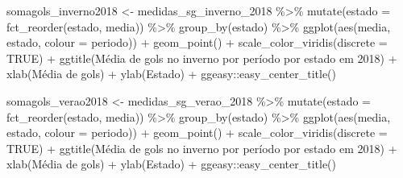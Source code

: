 \documentclass[
]{article}
\newenvironment{Shaded}{\begin{snugshade}}{\end{snugshade}}
\newcommand{\AttributeTok}[1]{\textcolor[rgb]{0.77,0.63,0.00}{#1}}
\newcommand{\ConstantTok}[1]{\textcolor[rgb]{0.00,0.00,0.00}{#1}}
\newcommand{\FunctionTok}[1]{\textcolor[rgb]{0.00,0.00,0.00}{#1}}
\newcommand{\NormalTok}[1]{#1}
\newcommand{\OtherTok}[1]{\textcolor[rgb]{0.56,0.35,0.01}{#1}}
\newcommand{\SpecialCharTok}[1]{\textcolor[rgb]{0.00,0.00,0.00}{#1}}
\newcommand{\StringTok}[1]{\textcolor[rgb]{0.31,0.60,0.02}{#1}}
\begin{document}
\begin{Shaded}
\begin{Highlighting}[]
\NormalTok{somagols\_inverno2018 }\OtherTok{\textless{}{-}}\NormalTok{ medidas\_sg\_inverno\_2018 }\SpecialCharTok{\%\textgreater{}\%} \FunctionTok{mutate}\NormalTok{(}\AttributeTok{estado =} \FunctionTok{fct\_reorder}\NormalTok{(estado, media)) }\SpecialCharTok{\%\textgreater{}\%} 
  \FunctionTok{group\_by}\NormalTok{(estado) }\SpecialCharTok{\%\textgreater{}\%}
  \FunctionTok{ggplot}\NormalTok{(}\FunctionTok{aes}\NormalTok{(media, estado, }\AttributeTok{colour =}\NormalTok{ periodo)) }\SpecialCharTok{+} \FunctionTok{geom\_point}\NormalTok{() }\SpecialCharTok{+}
  \FunctionTok{scale\_color\_viridis}\NormalTok{(}\AttributeTok{discrete =} \ConstantTok{TRUE}\NormalTok{) }\SpecialCharTok{+}
  \FunctionTok{ggtitle}\NormalTok{(}\StringTok{\textquotesingle{}Média de gols no inverno por período por estado em 2018\textquotesingle{}}\NormalTok{) }\SpecialCharTok{+} 
  \FunctionTok{xlab}\NormalTok{(}\StringTok{\textquotesingle{}Média de gols\textquotesingle{}}\NormalTok{) }\SpecialCharTok{+} \FunctionTok{ylab}\NormalTok{(}\StringTok{\textquotesingle{}Estado\textquotesingle{}}\NormalTok{) }\SpecialCharTok{+}
\NormalTok{  ggeasy}\SpecialCharTok{::}\FunctionTok{easy\_center\_title}\NormalTok{() }

\NormalTok{somagols\_verao2018 }\OtherTok{\textless{}{-}}\NormalTok{ medidas\_sg\_verao\_2018 }\SpecialCharTok{\%\textgreater{}\%} \FunctionTok{mutate}\NormalTok{(}\AttributeTok{estado =} \FunctionTok{fct\_reorder}\NormalTok{(estado, media)) }\SpecialCharTok{\%\textgreater{}\%} 
  \FunctionTok{group\_by}\NormalTok{(estado) }\SpecialCharTok{\%\textgreater{}\%}
  \FunctionTok{ggplot}\NormalTok{(}\FunctionTok{aes}\NormalTok{(media, estado, }\AttributeTok{colour =}\NormalTok{ periodo)) }\SpecialCharTok{+} \FunctionTok{geom\_point}\NormalTok{() }\SpecialCharTok{+}
  \FunctionTok{scale\_color\_viridis}\NormalTok{(}\AttributeTok{discrete =} \ConstantTok{TRUE}\NormalTok{) }\SpecialCharTok{+}
  \FunctionTok{ggtitle}\NormalTok{(}\StringTok{\textquotesingle{}Média de gols no inverno por período por estado em 2018\textquotesingle{}}\NormalTok{) }\SpecialCharTok{+} 
  \FunctionTok{xlab}\NormalTok{(}\StringTok{\textquotesingle{}Média de gols\textquotesingle{}}\NormalTok{) }\SpecialCharTok{+} \FunctionTok{ylab}\NormalTok{(}\StringTok{\textquotesingle{}Estado\textquotesingle{}}\NormalTok{) }\SpecialCharTok{+}
\NormalTok{  ggeasy}\SpecialCharTok{::}\FunctionTok{easy\_center\_title}\NormalTok{() }



\end{Highlighting}
\end{Shaded}
\end{document}
